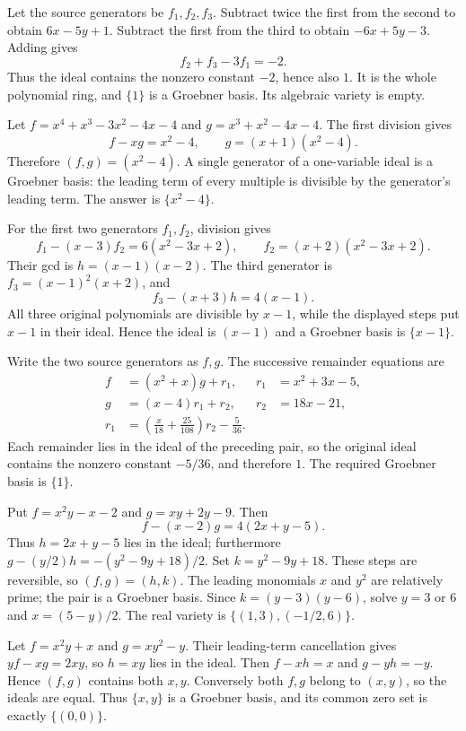 Let the source generators be $f_1,f_2,f_3$. Subtract twice the first from the second to obtain $6x-5y+1$. Subtract the first from the third to obtain $-6x+5y-3$. Adding gives
\[f_2+f_3-3f_1=-2.\]
Thus the ideal contains the nonzero constant $-2$, hence also $1$. It is the whole polynomial ring, and $\{1\}$ is a Groebner basis. Its algebraic variety is empty.

Let $f=x^4+x^3-3x^2-4x-4$ and $g=x^3+x^2-4x-4$. The first division gives
\[f-xg=x^2-4,\qquad g=(x+1)(x^2-4).\]
Therefore $(f,g)=(x^2-4)$. A single generator of a one-variable ideal is a Groebner basis: the leading term of every multiple is divisible by the generator's leading term. The answer is $\{x^2-4\}$.

For the first two generators $f_1,f_2$, division gives
\[f_1-(x-3)f_2=6(x^2-3x+2),\qquad f_2=(x+2)(x^2-3x+2).\]
Their gcd is $h=(x-1)(x-2)$. The third generator is $f_3=(x-1)^2(x+2)$, and
\[f_3-(x+3)h=4(x-1).\]
All three original polynomials are divisible by $x-1$, while the displayed steps put $x-1$ in their ideal. Hence the ideal is $(x-1)$ and a Groebner basis is $\{x-1\}$.

Write the two source generators as $f,g$. The successive remainder equations are
\[
\begin{aligned}
f&=(x^2+x)g+r_1,&r_1&=x^2+3x-5,\\
g&=(x-4)r_1+r_2,&r_2&=18x-21,\\
r_1&=\left(\frac{x}{18}+\frac{25}{108}\right)r_2-\frac5{36}.
\end{aligned}
\]
Each remainder lies in the ideal of the preceding pair, so the original ideal contains the nonzero constant $-5/36$, and therefore $1$. The required Groebner basis is $\{1\}$.

Put $f=x^2y-x-2$ and $g=xy+2y-9$. Then
\[f-(x-2)g=4(2x+y-5).\]
Thus $h=2x+y-5$ lies in the ideal; furthermore $g-(y/2)h=-(y^2-9y+18)/2$. Set $k=y^2-9y+18$. These steps are reversible, so $(f,g)=(h,k)$.
The leading monomials $x$ and $y^2$ are relatively prime; the pair is a Groebner basis. Since $k=(y-3)(y-6)$, solve $y=3$ or $6$ and $x=(5-y)/2$. The real variety is $\{(1,3),(-1/2,6)\}$.

Let $f=x^2y+x$ and $g=xy^2-y$. Their leading-term cancellation gives $yf-xg=2xy$, so $h=xy$ lies in the ideal. Then $f-xh=x$ and $g-yh=-y$. Hence $(f,g)$ contains both $x,y$. Conversely both $f,g$ belong to $(x,y)$, so the ideals are equal.
Thus $\{x,y\}$ is a Groebner basis, and its common zero set is exactly $\{(0,0)\}$.

